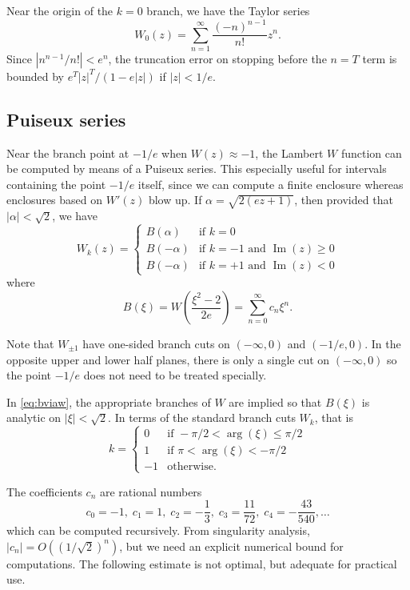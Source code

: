 \documentclass[11pt,a4paper]{article}
\begin{document}
Near the origin of the $k = 0$ branch, we have the Taylor series
$$W_0(z)= \sum_{n=1}^{\infty} \frac{(-n)^{n-1}}{n!} z^n.$$
Since $|n^{n-1} / n!| < e^n$, the truncation error
on stopping before the $n = T$ term is bounded by
$e^T |z|^T / (1 - e |z|)$ if $|z| < 1/e$.

\subsection{Puiseux series}
\label{sect:branchseries}

Near the branch point at $-1/e$ when $W(z) \approx -1$,
the Lambert $W$ function can be computed
by means of a Puiseux series.
This especially useful for intervals containing the point $-1/e$ itself, since we
can compute a finite enclosure whereas enclosures based on $W'(z)$ blow up.
If $\alpha = \sqrt{2(ez+1)}$, then provided that $|\alpha| < \sqrt{2}$, we have
$$W_k(z) = 
\begin{cases}
B\left(\alpha\right) & \text{if } k = 0 \\
B\left(-\alpha\right) & \text{if } k = -1 \text{ and } \operatorname{Im}(z) \ge 0 \\
B\left(-\alpha\right) & \text{if } k = +1 \text{ and } \operatorname{Im}(z) < 0
\end{cases}$$
where
\begin{equation}
\label{eq:bviaw}
B(\xi) = W\!\left(\frac{\xi^2 - 2}{2e}\right) = \sum_{n=0}^{\infty} c_n \xi^n.
\end{equation}

Note that $W_{\pm 1}$ have one-sided branch cuts on $(-\infty,0)$ and $(-1/e,0)$.
In the opposite upper and lower half planes,
there is only a single cut on $(-\infty,0)$
so the point $-1/e$ does not need to be treated specially.

In \eqref{eq:bviaw}, the appropriate branches
of $W$ are implied so that $B(\xi)$ is analytic on $|\xi| < \sqrt{2}$.
In terms of the
standard branch cuts $W_k$, that is
$$
k = \begin{cases}
0 & \text{if } -\pi/2 < \arg(\xi) \le \pi/2 \\
1 & \text{if } \pi < \arg(\xi) < -\pi/2 \\
-1 & \text{otherwise.}
\end{cases}$$

The coefficients $c_n$ are rational numbers
$$c_0 = -1, \; c_1 = 1, \; c_2 = -\frac{1}{3}, \; c_3 = \frac{11}{72}, \; c_4 = -\frac{43}{540}, \ldots$$
which can be computed recursively. From singularity analysis, $|c_n| = O((1/\sqrt{2})^n)$,
but we need an explicit numerical bound for computations.
The following estimate is not optimal, but adequate for practical use.
\end{document}
